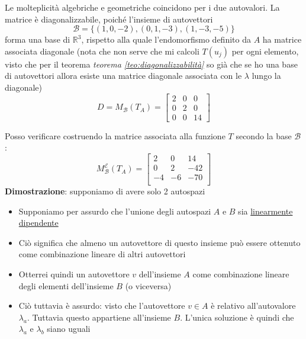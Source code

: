 \documentclass[12pt,a4paper,oneside]{article}
\begin{document}
Le molteplicità algebriche e geometriche coincidono per i due autovalori. La matrice è diagonalizzabile, poiché l'insieme di autovettori
\[
	\mathcal{B}=\{(1,0,-2),(0,1,-3),(1,-3,-5)\}
\]
forma una base di $\mathbb{R}^3$, rispetto alla quale l'endomorfismo definito da $A$ ha matrice associata diagonale (nota che non serve che mi calcoli $ T\left( u_j \right)  $ per ogni elemento, visto che per il teorema \textit{teorema  \ref{teo:diagonalizzabilità}} so già che se ho una base di autovettori allora esiste una matrice diagonale associata con le $ \lambda  $ lungo la diagonale)
\[
	D=M_{\mathcal{B}}\left(T_A\right)=\left[\begin{array}{ccc}
			2 & 0 & 0  \\
			0 & 2 & 0  \\
			0 & 0 & 14
		\end{array}\right]
\]

Posso verificare costruendo la matrice associata alla funzione $ T $ secondo la base $ \mathcal{B} $:
\[
	M_{ \mathcal{B}}^{ \mathcal{E} }\left( T_A \right)=
	\begin{bmatrix}
		2  & 0  & 14  \\
		0  & 2  & -42 \\
		-4 & -6 & -70 \\
	\end{bmatrix}
\]
\label{teo:indipendenzaAutovettori}
\textbf{Dimostrazione}: supponiamo di avere solo 2 autospazi
\begin{itemize}
	\item Supponiamo per assurdo che l'unione degli autospazi $ A $ e $ B $ sia \underline{linearmente dipendente}
	\item Ciò significa che almeno un autovettore di questo insieme può essere ottenuto come combinazione lineare di altri autovettori
	\item Otterrei quindi un autovettore $ v $ dell'insieme $ A $ come combinazione lineare degli elementi dell'insieme $ B $ (o viceversa)
	\item Ciò tuttavia è assurdo: visto che l'autovettore $ v \in A	$ è relativo all'autovalore $ \lambda_a $. Tuttavia questo appartiene all'insieme $ B $. L'unica soluzione è quindi che $ \lambda_a $ e $ \lambda_b $ siano uguali
\end{itemize}
\end{document}
